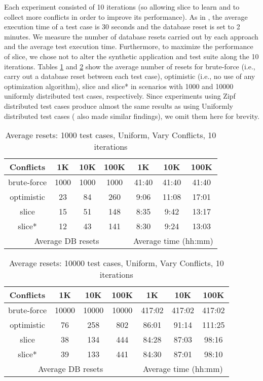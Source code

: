 \documentclass[authoryear,preprint,12pt]{elsarticle}
\begin{document}
Each experiment consisted of 10 iterations (so allowing {\sc slice} to learn and to collect more conflicts in order to improve its performance).
As in \cite{cidr05}, the average execution time of a test case is 30 seconds and the database reset is set to 2 minutes.
We measure the number of database resets carried out by each approach and the average test execution time.
Furthermore, to maximize the performance of {\sc slice},
we chose not to alter the synthetic application and test suite along the 10 iterations.
Tables \ref{1000} and \ref{10000} show the average number of resets for 
{\sc brute-force} (i.e., carry out a database reset between each test case),
{\sc optimistic} (i.e., no use of any optimization algorithm),
{\sc slice} and 
{\sc slice*} in scenarios with 1000 and 10000 uniformly distributed test cases, respectively.
Since experiments using Zipf distributed test cases 
produce almost the same results as using Uniformly distributed test cases (\cite{cidr05} also made similar findings),
we omit them here for brevity.

\begin{table}
\centering
\begin{tabular}{|c|c|c|c||c|c|c|}\hline
Conflicts        &    1K & 10K & 100K & 1K   & 10K & 100K    \\\hline\hline
{\sc brute-force}&  1000 &1000 & 1000 & 41:40&41:40& 41:40   \\\hline
{\sc optimistic} &    23 & 84   & 260 & 9:06 &11:08& 17:01   \\\hline
{\sc slice}      &    15 & 51 & 148 & 8:35 & 9:42& 13:17   \\\hline
{\sc slice*}     &   12  & 43 & 141 & 8:30 & 9:24& 13:03   \\\hline
\multicolumn{4}{c}{Average DB resets} &\multicolumn{3}{c}{Average time (hh:mm)}
\end{tabular}
\caption{Average resets: 1000 test cases, Uniform, Vary Conflicts, 10 iterations}
\label{1000}
\end{table}

\begin{table}
\centering
\begin{tabular}{|c|c|c|c||c|c|c|}\hline
Conflicts        &    1K & 10K & 100K & 1K   & 10K & 100K    \\\hline\hline
{\sc brute-force}&  10000 &10000 & 10000 & 417:02& 417:02& 417:02   \\\hline
{\sc optimistic} &    76 & 258   & 802 & 86:01 & 91:14 & 111:25   \\\hline
{\sc slice}      &   38  & 134  & 444  & 84:28 & 87:03& 98:16   \\\hline
{\sc slice*}     &   39  & 133  & 441  & 84:30 & 87:01& 98:10   \\\hline
\multicolumn{4}{c}{Average DB resets} &\multicolumn{3}{c}{Average time (hh:mm)}
\end{tabular}
\caption{Average resets: 10000 test cases, Uniform, Vary Conflicts, 10 iterations}
\label{10000}
\end{table}
\end{document}
